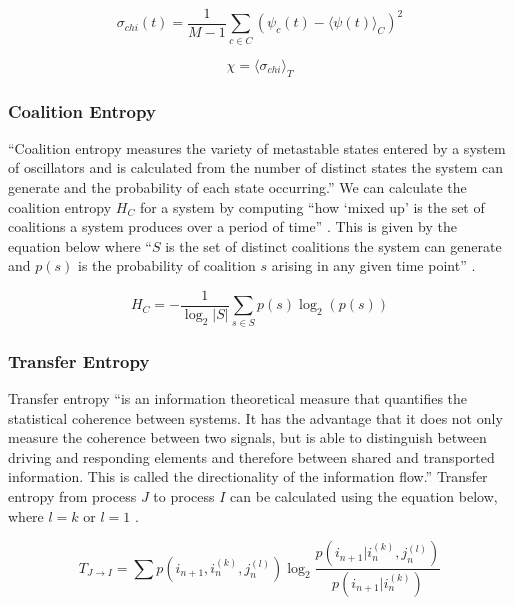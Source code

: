 \documentclass[a4paper,11pt]{article}
\begin{document}
\begin{equation} \label{eq:var-sync}
\sigma_{chi}(t) = \frac{1}{M - 1}\sum_{c \in C}(\psi_c(t) - \langle \psi(t) \rangle_C)^2
\end{equation}

\begin{equation} \label{eq:chi}
\chi = \langle \sigma_{chi} \rangle_T
\end{equation}


\subsubsection{Coalition Entropy} \label{sec:bg:hc}

``Coalition entropy measures the variety of metastable states entered by a system of oscillators and is calculated from the number of distinct states the system can generate and the probability of each state occurring.'' \cite{Bhowmik2013} We can calculate the coalition entropy $H_C$ for a system by computing ``how `mixed up' is the set of coalitions a system produces over a period of time'' \cite{Shanahan2010}. This is given by the equation below where ``$S$ is the set of distinct coalitions the system can generate and $p(s)$ is the probability of coalition $s$ arising in any given time point'' \cite{Shanahan2010}.

\begin{equation} \label{eq:hc}
H_C = - \frac{1}{\log_2 |S|}\sum_{s \in S}p(s) \log_2 (p(s))
\end{equation}

\subsubsection{Transfer Entropy}
Transfer entropy ``is an information theoretical measure that quantifies the statistical coherence between systems. It has the advantage that it does not only measure the coherence between two signals, but is able to distinguish between driving and responding elements and therefore between shared and transported information. This is called the directionality of the information flow.'' \cite{Buehlmann2010} Transfer entropy from process $J$ to process $I$ can be calculated using the equation below, where $l = k$ or $l = 1$ \cite{Schreiber2000}.

\begin{equation} \label{eq:te}
T_{J \rightarrow I} = \sum p(i_{n+1}, i_{n}^{(k)}, j_{n}^{(l)}) \log_2 \frac{p(i_{n+1} | i_{n}^{(k)}, j_{n}^{(l)})}{p(i_{n+1} | i_{n}^{(k)})}
\end{equation}
\end{document}
